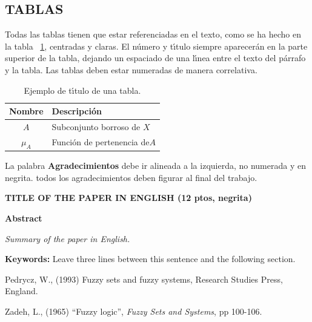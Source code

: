 \documentclass{article}
\begin{document}
\subsection{TABLAS}

Todas las tablas tienen que estar referenciadas en el texto, como se
ha hecho en la tabla ~\ref{ttabl}, centradas y claras. El n\'{u}mero y t\'{\i}tulo
siempre aparecer\'{a}n en la parte superior de la tabla, dejando un espaciado
de una l\'{\i}nea entre el texto del p\'{a}rrafo y la tabla. Las tablas deben estar
numeradas de manera correlativa.

\begin{table}[ht]
\begin{center}
\caption{Ejemplo de t\'{\i}tulo de una tabla.}\label{ttabl}
\begin{tabular}{|c|l|}
   \hline
   {\bf Nombre} & {\bf Descripci\'{o}n} \\ \hline $A$ &   Subconjunto borroso de $X$\\
   $\mu_{A}$ & Funci\'{o}n de pertenencia de$A$ \\
   \hline
\end{tabular}
\end{center}
\end{table}

\begin{acknowl}
La palabra {\bf Agradecimientos} debe ir alineada a la izquierda,
no numerada y en negrita. todos los agradecimientos deben figurar al final
del trabajo.
\end{acknowl}

\begin{eng}

\large\bf{TITLE OF THE PAPER IN ENGLISH (12 ptos, negrita)}\bigskip

\large\bf{Abstract}\bigskip
\normalfont

{\em Summary of the paper in English.} \bigskip

{\bf Keywords:} Leave three lines between this sentence and the following section.

\end{eng}\bigskip

\begin{thebibliography}{99}

 Pedrycz, W., (1993) Fuzzy sets and fuzzy systems,
Research Studies Press, England.

 Zadeh, L., (1965) ``Fuzzy logic'',
{\em Fuzzy Sets and Systems}, pp 100-106.

\end{thebibliography}
\end{document}
